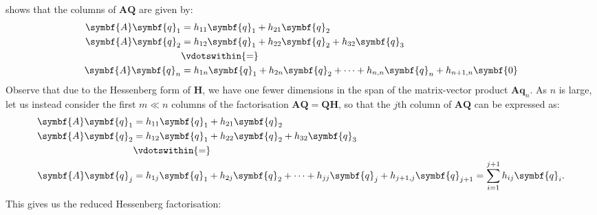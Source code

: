 \documentclass{article}
\begin{document}
shows that the columns of \(\symbf{A}\symbf{Q}\) are given by:
\begin{align*}
    \symbf{A} \symbf{q}_1 & = h_{11} \symbf{q}_1 + h_{21} \symbf{q}_2                                                      \\
    \symbf{A} \symbf{q}_2 & = h_{12} \symbf{q}_1 + h_{22} \symbf{q}_2 + h_{32} \symbf{q}_3                                 \\
                          & \vdotswithin{=}                                                                                \\
    \symbf{A} \symbf{q}_n & = h_{1n} \symbf{q}_1 + h_{2n} \symbf{q}_2 + \cdots + h_{n,n} \symbf{q}_n + h_{n+1,n} \symbf{0}
\end{align*}
Observe that due to the Hessenberg form of \(\symbf{H}\), we have one
fewer dimensions in the span of the matrix-vector product
\(\symbf{A} \symbf{q}_n\). As \(n\) is large, let us instead consider
the first \(m \ll n\) columns of the factorisation
\(\symbf{A} \symbf{Q} = \symbf{Q} \symbf{H}\), so that the \(j\)th
column of \(\symbf{A} \symbf{Q}\) can be expressed as:
\begin{align*}
    \symbf{A} \symbf{q}_1 & = h_{11} \symbf{q}_1 + h_{21} \symbf{q}_2                                                                                                  \\
    \symbf{A} \symbf{q}_2 & = h_{12} \symbf{q}_1 + h_{22} \symbf{q}_2 + h_{32} \symbf{q}_3                                                                             \\
                          & \vdotswithin{=}                                                                                                                            \\
    \symbf{A} \symbf{q}_j & = h_{1j} \symbf{q}_1 + h_{2j} \symbf{q}_2 + \cdots + h_{jj} \symbf{q}_j + h_{j+1,j} \symbf{q}_{j+1} = \sum_{i=1}^{j+1} h_{ij} \symbf{q}_i.
\end{align*}
This gives us the reduced Hessenberg factorisation:
\end{document}
